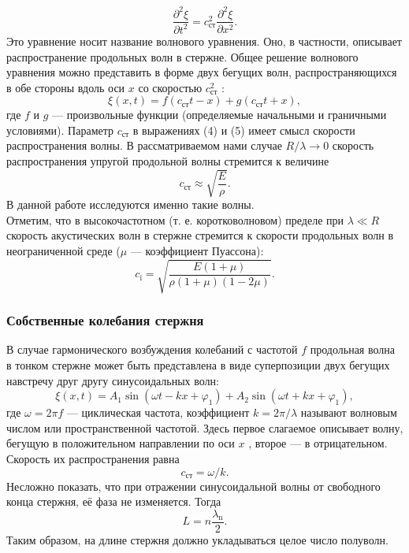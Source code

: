\documentclass[a4paper, 12pt]{article}%
\begin{document}
\begin{equation}
\dfrac{\partial^2\xi}{\partial t^2}=c^2_{\text{ст}}\dfrac{\partial^2\xi}{\partial x^2}.
\end{equation}
Это уравнение носит название волнового  уравнения. Оно, в частности,
описывает распространение продольных волн в стержне. Общее решение
волнового уравнения можно представить в форме двух бегущих волн, распространяющихся в обе стороны вдоль оси $x$ со скоростью
$c^2_{\text{ст}}$ :
\begin{equation}
\xi(x,t)=f(c_{\text{ст}}t-x)+g(c_{\text{ст}}t+x),
\end{equation}
где $f$ и $g$ — произвольные функции (определяемые начальными и граничными
условиями).
Параметр $c_{\text{ст}}$ в выражениях (4) и (5) имеет смысл скорости распространения волны. В рассматриваемом нами случае $R/\lambda\rightarrow 0$ скорость распространения
упругой продольной волны стремится к величине
\begin{equation}
c_{\text{ст}}\approx\sqrt{\dfrac{E}{\rho}}.
\end{equation}
В данной работе исследуются именно такие волны. \\
Отметим, что в высокочастотном (т. е. коротковолновом) пределе
при $\lambda\ll R$ скорость акустических волн в стержне стремится к скорости продольных волн в неограниченной среде ($\mu$ — коэффициент Пуассона): 
\begin{equation}
c_{\text{i}}=\sqrt{\dfrac{E(1+\mu)}{\rho(1+\mu)(1-2\mu)}}.
\end{equation}
\subsubsection{Собственные колебания стержня}
В случае гармонического возбуждения колебаний с частотой $f$ продольная волна в тонком стержне может быть представлена в виде суперпозиции двух бегущих навстречу друг другу синусоидальных волн:
\begin{equation}
\xi(x,t)=A_1\sin(\omega t-kx+\varphi_1)+A_2\sin(\omega t+kx+\varphi_1),
\end{equation}
где $\omega=2\pi f$ — циклическая частота, коэффициент $k=2\pi/\lambda$ называют волновым числом или пространственной частотой. Здесь первое слагаемое описывает волну, бегущую в положительном направлении по оси $x$ , второе
— в отрицательном. Скорость их распространения равна
\[c_{\text{ст}}=\omega/k.\]
Несложно показать, что при отражении синусоидальной волны от свободного конца стержня, её фаза не изменяется. Тогда
\begin{equation}
L=n\frac{\lambda_{\text{n}}}{2}.
\end{equation}
Таким образом, на длине стержня должно укладываться целое число полуволн.
\end{document}
